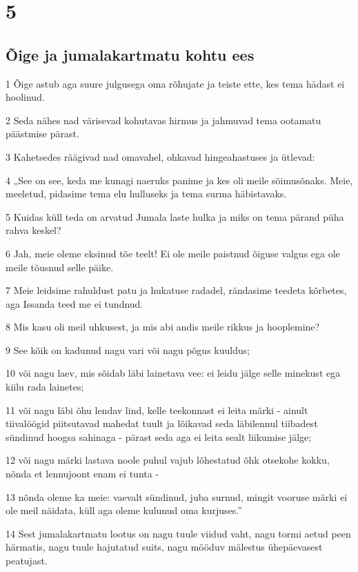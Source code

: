 \chapter{5}

\section*{Õige ja jumalakartmatu kohtu ees}

\par 1 Õige astub aga suure julgusega oma rõhujate ja teiste ette, kes tema hädast ei hoolinud.
\par 2 Seda nähes nad värisevad kohutavas hirmus ja jahmuvad tema ootamatu päästmise pärast.
\par 3 Kahetsedes räägivad nad omavahel, ohkavad hingeahastuses ja ütlevad:
\par 4 „See on see, keda me kunagi naeruks panime ja kes oli meile sõimusõnaks. Meie, meeletud, pidasime tema elu hulluseks ja tema surma häbistavaks.
\par 5 Kuidas küll teda on arvatud Jumala laste hulka ja miks on tema pärand püha rahva keskel?
\par 6 Jah, meie oleme eksinud tõe teelt! Ei ole meile paistnud õiguse valgus ega ole meile tõusnud selle päike.
\par 7 Meie leidsime rahuldust patu ja hukatuse radadel, rändasime teedeta kõrbetes, aga Issanda teed me ei tundnud.
\par 8 Mis kasu oli meil uhkusest, ja mis abi andis meile rikkus ja hooplemine?
\par 9 See kõik on kadunud nagu vari või nagu põgus kuuldus;
\par 10 või nagu laev, mis sõidab läbi lainetava vee: ei leidu jälge selle minekust ega kiilu rada lainetes;
\par 11 või nagu läbi õhu lendav lind, kelle teekonnast ei leita märki - ainult tiivalöögid piitsutavad mahedat tuult ja lõikavad seda läbilennul tiibadest sündinud hoogsa sahinaga - pärast seda aga ei leita sealt liikumise jälge;
\par 12 või nagu märki lastava noole puhul vajub lõhestatud õhk otsekohe kokku, nõnda et lennujoont enam ei tunta -
\par 13 nõnda oleme ka meie: vaevalt sündinud, juba surnud, mingit vooruse märki ei ole meil näidata, küll aga oleme kulunud oma kurjuses.”
\par 14 Sest jumalakartmatu lootus on nagu tuule viidud vaht, nagu tormi aetud peen härmatis, nagu tuule hajutatud suits, nagu mööduv mälestus ühepäevasest peatujast.
